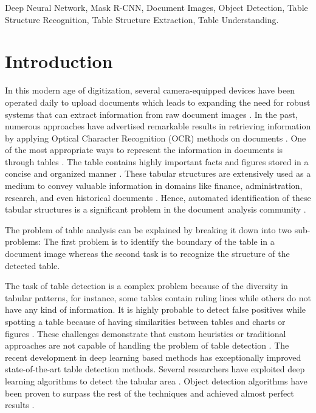 \documentclass{ieeeaccess}
\begin{document}
\begin{keywords}

Deep Neural Network, Mask R-CNN, Document Images, Object Detection, Table Structure Recognition, Table Structure Extraction, Table Understanding.
\end{keywords}



\maketitle

\section{Introduction}
\label{sec:introduction}

In this modern age of digitization, several camera-equipped devices \cite{b60} have been operated daily to upload documents which leads to expanding the need for robust systems that can extract information from raw document images \cite{b61}. In the past, numerous approaches have advertised remarkable results in retrieving information by applying Optical Character Recognition (OCR) methods on documents \cite{b37, b38, b39}. One of the most appropriate ways to represent the information in documents is through tables \cite{b2}. The table contains highly important facts and figures stored in a concise and organized manner \cite{b10}. These tabular structures are extensively used as a medium to convey valuable information in domains like finance, administration, research, and even historical documents \cite{b41}. Hence, automated identification of these tabular structures is a significant problem in the document analysis community \cite{b2,b3,b4}.

The problem of table analysis can be explained by breaking it down into two sub-problems: The first problem is to identify the boundary of the table in a document image whereas the second task is to recognize the structure of the detected table\cite{b10}.

The task of table detection is a complex problem because of the diversity in tabular patterns, for instance, some tables contain ruling lines while others do not have any kind of information. It is highly probable to detect false positives while spotting a table because of having similarities between tables and charts or figures \cite{b48}. These challenges demonstrate that custom heuristics or traditional approaches are not capable of handling the problem of table detection \cite{b41}. The recent development in deep learning based methods has exceptionally improved state-of-the-art table detection methods. Several researchers have exploited deep learning algorithms to detect the tabular area \cite{b23,b28,b40}. Object detection algorithms have been proven to surpass the rest of the techniques and achieved almost perfect results \cite{b41,b56}.
\end{document}
